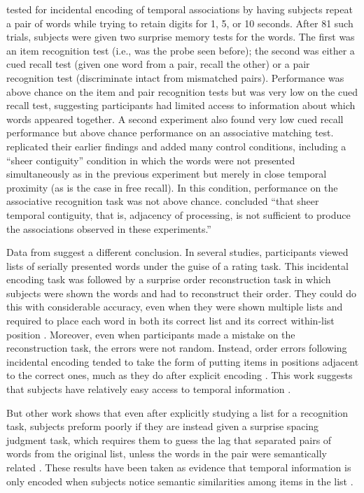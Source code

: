\documentclass[man,natbib,floatsintext]{apa6} %
\begin{document}
\citet{GlenBrad79} tested for incidental encoding of temporal associations by having subjects repeat a pair of words while trying to retain digits for 1, 5, or 10 seconds. After 81 such trials, subjects were given two surprise memory tests for the words. The first was an item recognition test (i.e., was the probe seen before); the second was either a cued recall test (given one word from a pair, recall the other) or a pair recognition test (discriminate intact from mismatched pairs). Performance was above chance on the item and pair recognition tests but was very low on the cued recall test, suggesting participants had limited access to information about which words appeared together. A second experiment also found very low cued recall performance but above chance performance on an associative matching test. \citet{BradGlen83} replicated their earlier findings and added many control conditions, including a ``sheer contiguity'' condition in which the words were not presented simultaneously as in the previous experiment but merely in close temporal proximity (as is the case in free recall). In this condition, performance on the associative recognition task was not above chance. \citet[][p. 665]{BradGlen83} concluded ``that sheer temporal contiguity, that is, adjacency of processing, is not sufficient to produce the associations observed in these experiments.''

Data from \citet{Nair91, Nair90b} suggest a different conclusion. In several studies, participants viewed lists of serially presented words under the guise of a rating task. This incidental encoding task was followed by a surprise order reconstruction task in which subjects were shown the words and had to reconstruct their order. They could do this with considerable accuracy, even when they were shown multiple lists and required to place each word in both its correct list and its correct within-list position \citep{Nair91}. Moreover, even when participants made a mistake on the reconstruction task, the errors were not random. Instead, order errors following incidental encoding tended to take the form of putting items in positions adjacent to the correct ones, much as they do after explicit encoding \citep{Heal74}. This work suggests that subjects have relatively easy access to temporal information \citep[for related examples of access to order information after incidental encoding see,][]{Burn96,SerrNair93}. 

But other work shows that even after explicitly studying a list for a recognition task, subjects preform poorly if they are instead given a surprise spacing judgment task, which requires them to guess the lag that separated pairs of words from the original list, unless the words in the pair were semantically related \citep{HintEtal75,HintBloc73}. These results have been taken as evidence that temporal information is only encoded when subjects notice semantic similarities among items in the list \citep[i.e., study phase retreival]{HintEtal75,HintBloc73,Hint16}.
\end{document}
